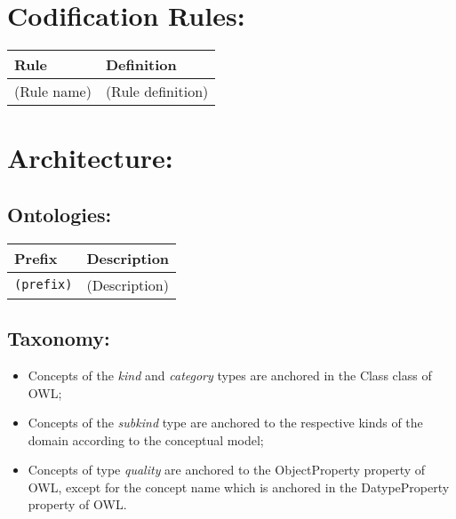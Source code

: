 \documentclass[table,usenames,dvipsnames]{article}
\begin{document}
\section{Codification Rules:}
\label{sec-coderules}

\begin{center}
	\begin{small}
		\begin{longtable}{ p{20mm} p{140mm} }
			\hline
			\textbf{Rule} & \textbf{Definition} \\\hline
			
			(Rule name) 
				& (Rule definition) 
				\\\hline			
		\end{longtable}
	\end{small}
\end{center}



\section{Architecture:}
\label{sec-architecture}

\subsection{Ontologies:}
\label{sec-architecture-ontologies}

\begin{center}
	\begin{small}
		\begin{longtable}{ p{20mm} p{140mm} }
			\hline
			\textbf{Prefix} & \textbf{Description} \\\hline
			
			\texttt{(prefix)}
				& (Description)
				\\\hline
		\end{longtable}
	\end{small}
\end{center}



\subsection{Taxonomy:}
\label{sec-architecture-taxonomy}

\begin{itemize}
	\item Concepts of the \emph{kind} and \emph{category} types are anchored in the \textsf{Class} class of OWL;

	\item Concepts of the \emph{subkind} type are anchored to the respective kinds of the domain according to the conceptual model;

	\item Concepts of type \emph{quality} are anchored to the \textsf{ObjectProperty} property of OWL, except for the concept name which is anchored in the \textsf{DatypeProperty} property of OWL.
\end{itemize}




\end{document}
